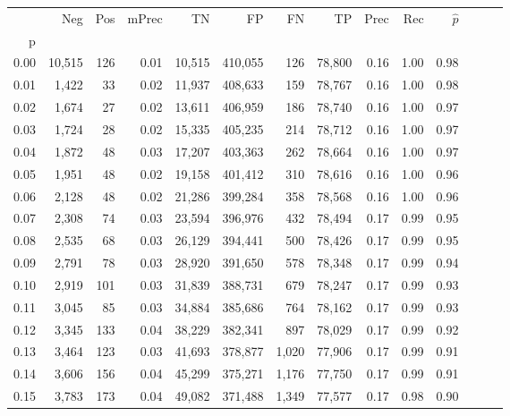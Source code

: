 \begin{tabular}{rrrrrrrrrrrrrr}
\toprule
{} &     Neg &    Pos & mPrec &       TN &       FP &      FN &      TP &  Prec &   Rec & $\hat{p}$ \\
p    &         &        &       &          &          &         &         &       &       &           \\
\midrule
0.00 &  10,515 &    126 &  0.01 &   10,515 &  410,055 &     126 &  78,800 &  0.16 &  1.00 &      0.98 \\
0.01 &   1,422 &     33 &  0.02 &   11,937 &  408,633 &     159 &  78,767 &  0.16 &  1.00 &      0.98 \\
0.02 &   1,674 &     27 &  0.02 &   13,611 &  406,959 &     186 &  78,740 &  0.16 &  1.00 &      0.97 \\
0.03 &   1,724 &     28 &  0.02 &   15,335 &  405,235 &     214 &  78,712 &  0.16 &  1.00 &      0.97 \\
0.04 &   1,872 &     48 &  0.03 &   17,207 &  403,363 &     262 &  78,664 &  0.16 &  1.00 &      0.97 \\
0.05 &   1,951 &     48 &  0.02 &   19,158 &  401,412 &     310 &  78,616 &  0.16 &  1.00 &      0.96 \\
0.06 &   2,128 &     48 &  0.02 &   21,286 &  399,284 &     358 &  78,568 &  0.16 &  1.00 &      0.96 \\
0.07 &   2,308 &     74 &  0.03 &   23,594 &  396,976 &     432 &  78,494 &  0.17 &  0.99 &      0.95 \\
0.08 &   2,535 &     68 &  0.03 &   26,129 &  394,441 &     500 &  78,426 &  0.17 &  0.99 &      0.95 \\
0.09 &   2,791 &     78 &  0.03 &   28,920 &  391,650 &     578 &  78,348 &  0.17 &  0.99 &      0.94 \\
0.10 &   2,919 &    101 &  0.03 &   31,839 &  388,731 &     679 &  78,247 &  0.17 &  0.99 &      0.93 \\
0.11 &   3,045 &     85 &  0.03 &   34,884 &  385,686 &     764 &  78,162 &  0.17 &  0.99 &      0.93 \\
0.12 &   3,345 &    133 &  0.04 &   38,229 &  382,341 &     897 &  78,029 &  0.17 &  0.99 &      0.92 \\
0.13 &   3,464 &    123 &  0.03 &   41,693 &  378,877 &   1,020 &  77,906 &  0.17 &  0.99 &      0.91 \\
0.14 &   3,606 &    156 &  0.04 &   45,299 &  375,271 &   1,176 &  77,750 &  0.17 &  0.99 &      0.91 \\
0.15 &   3,783 &    173 &  0.04 &   49,082 &  371,488 &   1,349 &  77,577 &  0.17 &  0.98 &      0.90 \\

\end{tabular}
